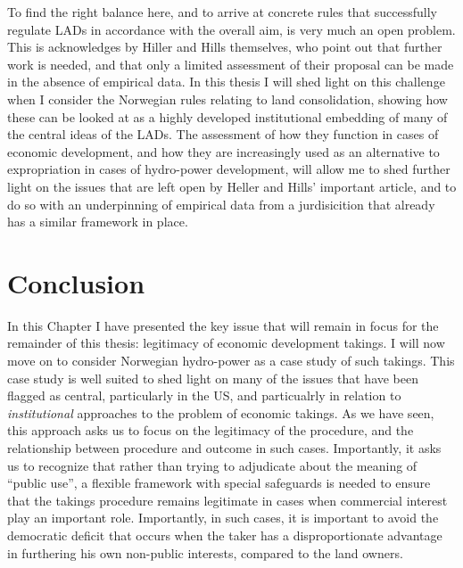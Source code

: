 To find the right balance here, and to arrive at concrete rules that successfully regulate LADs in accordance with the overall aim, is very much an open problem. This is acknowledges by Hiller and Hills themselves, who point out that further work is needed, and that only a limited assessment of their proposal can be made in the absence of empirical data. In this thesis I will shed light on this challenge when I consider the Norwegian rules relating to land consolidation, showing how these can be looked at as a highly developed institutional embedding of many of the central ideas of the LADs. The assessment of how they function in cases of economic development, and how they are increasingly used as an alternative to expropriation in cases of hydro-power development, will allow me to shed further light on the issues that are left open by Heller and Hills' important article, and to do so with an underpinning of empirical data from a jurdisicition that already has a similar framework in place.

\section{Conclusion}

In this Chapter I have presented the key issue that will remain in focus for the remainder of this thesis: legitimacy of economic development takings. I will now move on to consider Norwegian hydro-power as a case study of such takings. This case study is well suited to shed light on many of the issues that have been flagged as central, particularly in the US, and particualrly in relation to {\it institutional} approaches to the problem of economic takings. As we have seen, this approach asks us to focus on the legitimacy of the procedure, and the relationship between procedure and outcome in such cases. Importantly, it asks us to recognize that rather than trying to adjudicate about the meaning of ``public use'', a flexible framework with special safeguards is needed to ensure that the takings procedure remains legitimate in cases when commercial interest play an important role. Importantly, in such cases, it is important to avoid the democratic deficit that occurs when the taker has a disproportionate advantage in furthering his own non-public interests, compared to the land owners. 

